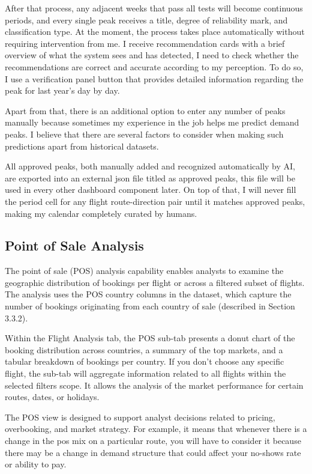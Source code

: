 After that process, any adjacent weeks that pass all tests will become continuous periods, and every single peak receives a title, degree of reliability mark, and classification type. At the moment, the process takes place automatically without requiring intervention from me. I receive recommendation cards with a brief overview of what the system sees and has detected, I need to check whether the recommendations are correct and accurate according to my perception. To do so, I use a verification panel button that provides detailed information regarding the peak for last year's day by day.

Apart from that, there is an additional option to enter any number of peaks manually because sometimes my experience in the job helps me predict demand peaks. I believe that there are several factors to consider when making such predictions apart from historical datasets.

All approved peaks, both manually added and recognized automatically by AI, are exported into an external json file titled as approved peaks, this file will be used in every other dashboard component later. On top of that, I will never fill the period cell for any flight route-direction pair until it matches approved peaks, making my calendar completely curated by humans.

\subsection{Point of Sale Analysis}

The point of sale (POS) analysis capability enables analysts to examine the geographic distribution of bookings per flight or across a filtered subset of flights. The analysis uses the POS country columns in the dataset, which capture the number of bookings originating from each country of sale (described in Section 3.3.2).

Within the Flight Analysis tab, the POS sub-tab presents a donut chart of the booking distribution across countries, a summary of the top markets, and a tabular breakdown of bookings per country. If you don't choose any specific flight, the sub-tab will aggregate information related to all flights within the selected filters scope. It allows the analysis of the market performance for certain routes, dates, or holidays.

The POS view is designed to support analyst decisions related to pricing, overbooking, and market strategy. For example, it means that whenever there is a change in the pos mix on a particular route, you will have to consider it because there may be a change in demand structure that could affect your no-shows rate or ability to pay.

